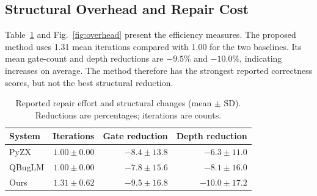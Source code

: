 \documentclass[conference]{IEEEtran}
\begin{document}
\subsection{Structural Overhead and Repair Cost}
Table~\ref{tab:cost} and Fig.~\ref{fig:overhead} present the efficiency measures. The proposed method uses 1.31 mean iterations compared with 1.00 for the two baselines. Its mean gate-count and depth reductions are $-9.5\%$ and $-10.0\%$, indicating increases on average. The method therefore has the strongest reported correctness scores, but not the best structural reduction.

\begin{table}[t]
\caption{Reported repair effort and structural changes (mean $\pm$ SD). Reductions are percentages; iterations are counts.}
\label{tab:cost}
\centering\footnotesize
\begin{tabular}{@{}lrrr@{}}
\toprule
System & Iterations & Gate reduction & Depth reduction\\
\midrule
PyZX & $1.00\pm0.00$ & $-8.4\pm13.8$ & $-6.3\pm11.0$\\
QBugLM & $1.00\pm0.00$ & $-7.8\pm15.6$ & $-8.1\pm16.0$\\
Ours & $1.31\pm0.62$ & $-9.5\pm16.8$ & $-10.0\pm17.2$\\
\bottomrule
\end{tabular}
\end{table}
\end{document}
